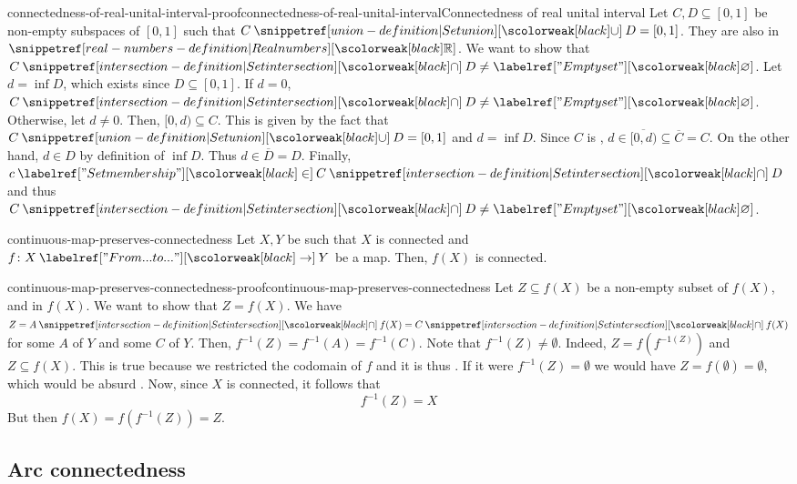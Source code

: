 \documentclass[preview]{standalone}
\begin{document}
\begin{snippetproof}{connectedness-of-real-unital-interval-proof}{connectedness-of-real-unital-interval}{Connectedness of real unital interval}
    Let \(C, D \subseteq [0,1]\)
    be non-empty \closedset[closed] subspaces of \([0,1]\)
    such that \(C \union D = [0,1]\).
    They are also \closedset[closed] in \(\realnumbers\).
    We want to show that \(C \intersection D \neq \emptyset\).
    Let \(d = \inf D\), which exists since \(D \subseteq [0,1]\).
    If \(d=0\), \(C \intersection D \neq \emptyset\).
    Otherwise, let \(d \neq 0\). Then,
    \([0, d) \subseteq C\). This is given by the fact that \(C \union D = [0,1]\)
    and \(d = \inf D\).
    Since \(C\) is \closedset[closed], \(d \in \overline{[0,d)} \subseteq \overline{C} = C\).
    On the other hand, \(d \in D\) by definition of \(\inf D\).
    Thus \(d \in \overline{D} = D\).
    Finally, \(c\in C \intersection D\) and thus \(C \intersection D \neq \emptyset\).
\end{snippetproof}

\begin{snippetproposition}{continuous-map-preserves-connectedness}{}
    Let \(X,Y\) be 
    such that \(X\) is connected
    and \(f \colon X \fromto Y\) be a map.
    Then, \(f(X)\) is connected.
\end{snippetproposition}

\begin{snippetproof}{continuous-map-preserves-connectedness-proof}{continuous-map-preserves-connectedness}{}
    Let \(Z \subseteq f(X)\)
    be a non-empty subset of \(f(X)\), 
    and \closedset[closed] in \(f(X)\). We want to show that \(Z = f(X)\).
    We have \(Z = A \intersection f(X) = C \intersection f(X)\)
    for some  \(A\) of \(Y\)
    and some  \(C\) of \(Y\).
    Then, \(f^{-1}(Z) = f^{-1}(A) = f^{-1}(C)\).
    Note that \(f^{-1}(Z) \neq \emptyset\).
    Indeed, \(Z = f(f^{-1(Z)})\)
    and \(Z \subseteq f(X)\).
    This is true because we restricted the codomain of \(f\) and it is thus \surjective.
    If it were \(f^{-1}(Z) = \emptyset\) we would have \(Z = f(\emptyset) = \emptyset\),
    which would be absurd \lightning.
    Now, since \(X\) is connected, it follows that
    \[
        f^{-1}(Z) = X
    \]
    But then \(f(X) = f(f^{-1}(Z)) = Z\).
\end{snippetproof}

\subsection{Arc connectedness}
\end{document}
